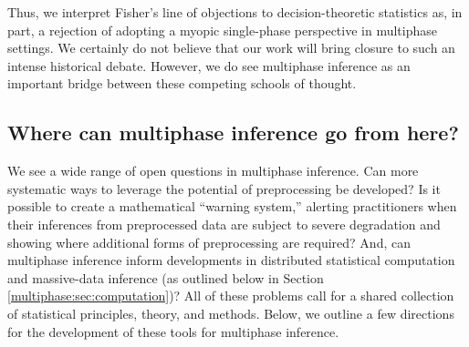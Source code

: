 Thus, we interpret Fisher's line of objections to decision-theoretic statistics as, in part, a rejection of adopting a myopic single-phase perspective in multiphase settings.
We certainly do not believe that our work will bring closure to such an intense historical debate.
However, we do see multiphase inference as an important bridge between these competing schools of thought.

\subsection{Where can multiphase inference go from here?}
\label{multiphase:sec:future}

We see a wide range of open questions in multiphase inference.
Can more systematic ways to leverage the potential of preprocessing be developed?
Is it possible to create a  mathematical ``warning system,'' alerting practitioners when their inferences from preprocessed data are subject to severe degradation and showing where additional forms of preprocessing are required?
And, can multiphase inference inform developments in distributed statistical computation and massive-data inference (as outlined below in Section \ref{multiphase:sec:computation})?
All of these problems call for a shared collection of statistical principles, theory, and methods.
Below, we outline a few directions for the development of these tools for multiphase inference.


